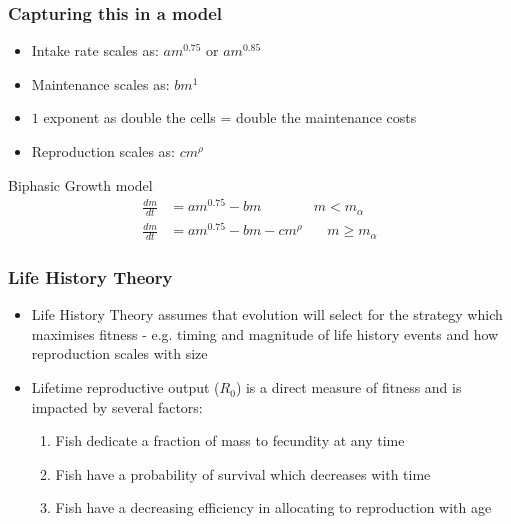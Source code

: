 \documentclass[handout]{beamer}
\begin{document}
\begin{frame}
	\frametitle{Capturing this in a model}
	\begin{itemize}
		\item Intake rate scales as: $am^{0.75}$ or $am^{0.85}$
		
		\item Maintenance scales as: $bm^{1}$
		\item $1$ exponent as double the cells = double the maintenance costs
		\item Reproduction scales as: $cm^{\rho}$
	\end{itemize}

	\begin{block}{Biphasic Growth model}
		\begin{align*}
			\frac{dm}{dt} &= am^{0.75} - bm \ \ \ \ \ \ \ \ \ \ \ \ \ \ \ \ \ m < m_{\alpha}\\
			\frac{dm}{dt} &= am^{0.75} - bm - cm^{\rho} \ \ \ \ \  \ \ \ m \geq m_{\alpha}
		\end{align*}
	\end{block}
\end{frame}

\begin{frame}
	\frametitle{Life History Theory}
	\begin{itemize}
		\item Life History Theory assumes that evolution will select for the strategy which maximises fitness - e.g. timing and magnitude of life history events and how reproduction scales with size
		\item Lifetime reproductive output ($R_0$) is a direct measure of fitness and is impacted by several factors:
		\begin{enumerate}
			\item Fish dedicate a fraction of mass to fecundity at any time 
			\item Fish have a probability of survival which decreases with time
			\item Fish have a decreasing efficiency in allocating to reproduction with age
		\end{enumerate}
	\end{itemize}
\end{frame}
\end{document}
